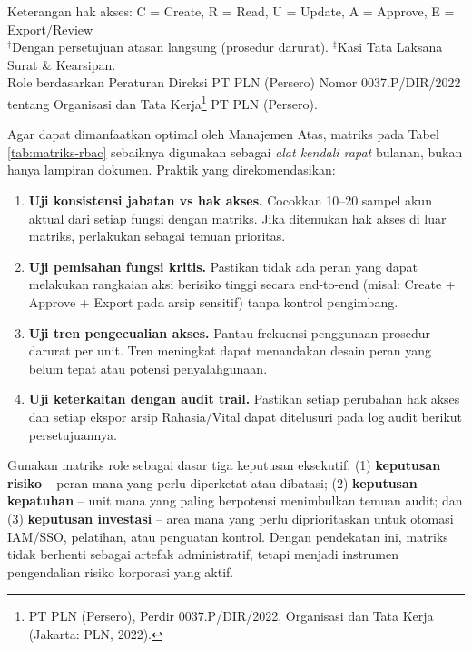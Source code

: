 \documentclass[12pt,a4paper]{report}
\begin{document}
Keterangan hak akses: C = Create, R = Read, U = Update, A = Approve, E = Export/Review\\
$^{\dagger}$Dengan persetujuan atasan langsung (prosedur darurat). $^{\ddagger}$Kasi Tata Laksana Surat \& Kearsipan.\\
Role berdasarkan Peraturan Direksi PT PLN (Persero) Nomor 0037.P/DIR/2022 tentang Organisasi dan Tata Kerja\footnote{PT PLN (Persero), Perdir 0037.P/DIR/2022, Organisasi dan Tata Kerja (Jakarta: PLN, 2022).} PT PLN (Persero).

Agar dapat dimanfaatkan optimal oleh Manajemen Atas, matriks pada Tabel \ref{tab:matriks-rbac} sebaiknya digunakan sebagai \textit{alat kendali rapat} bulanan, bukan hanya lampiran dokumen. Praktik yang direkomendasikan:
\begin{enumerate}[leftmargin=*]
  \item \textbf{Uji konsistensi jabatan vs hak akses.} Cocokkan 10--20 sampel akun aktual dari setiap fungsi dengan matriks. Jika ditemukan hak akses di luar matriks, perlakukan sebagai temuan prioritas.
  \item \textbf{Uji pemisahan fungsi kritis.} Pastikan tidak ada peran yang dapat melakukan rangkaian aksi berisiko tinggi secara end-to-end (misal: Create + Approve + Export pada arsip sensitif) tanpa kontrol pengimbang.
  \item \textbf{Uji tren pengecualian akses.} Pantau frekuensi penggunaan prosedur darurat per unit. Tren meningkat dapat menandakan desain peran yang belum tepat atau potensi penyalahgunaan.
  \item \textbf{Uji keterkaitan dengan audit trail.} Pastikan setiap perubahan hak akses dan setiap ekspor arsip Rahasia/Vital dapat ditelusuri pada log audit berikut persetujuannya.
\end{enumerate}

\begin{plnbox}
Gunakan matriks role sebagai dasar tiga keputusan eksekutif: (1) \textbf{keputusan risiko} -- peran mana yang perlu diperketat atau dibatasi; (2) \textbf{keputusan kepatuhan} -- unit mana yang paling berpotensi menimbulkan temuan audit; dan (3) \textbf{keputusan investasi} -- area mana yang perlu diprioritaskan untuk otomasi IAM/SSO, pelatihan, atau penguatan kontrol. Dengan pendekatan ini, matriks tidak berhenti sebagai artefak administratif, tetapi menjadi instrumen pengendalian risiko korporasi yang aktif.
\end{plnbox}
\end{document}
